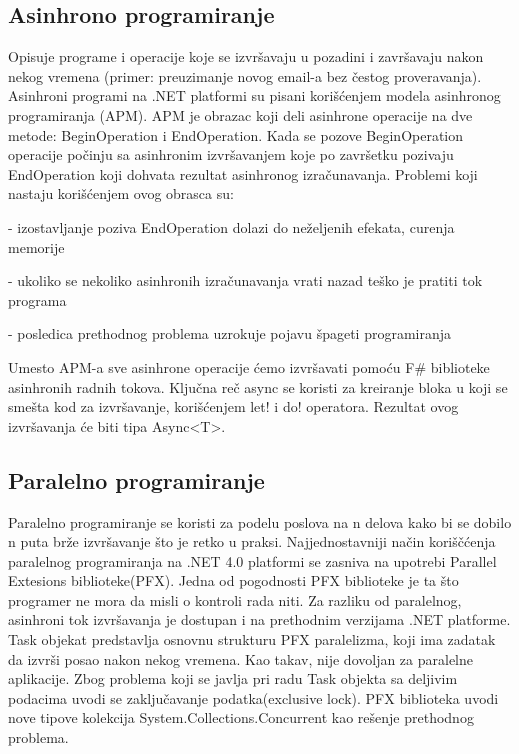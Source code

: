 \documentclass[a4paper]{article}
\begin{document}
\subsection{Asinhrono programiranje} 

Opisuje programe i operacije koje se izvršavaju u pozadini i završavaju nakon nekog vremena (primer: preuzimanje novog email-a bez čestog proveravanja). Asinhroni programi na .NET platformi su pisani korišćenjem modela asinhronog programiranja (APM). APM je obrazac koji deli asinhrone operacije na dve metode: BeginOperation i EndOperation. Kada se pozove BeginOperation operacije počinju sa asinhronim izvršavanjem koje po završetku pozivaju EndOperation koji dohvata rezultat asinhronog izračunavanja. Problemi koji nastaju korišćenjem ovog obrasca su: 

	- izostavljanje poziva EndOperation dolazi do neželjenih efekata, curenja memorije 
 
	- ukoliko se nekoliko asinhronih izračunavanja vrati nazad teško je pratiti tok programa
	
	- posledica prethodnog problema uzrokuje pojavu špageti programiranja

Umesto APM-a sve asinhrone operacije ćemo izvršavati pomoću F\# biblioteke asinhronih radnih tokova\cite{workFlow}. Ključna reč async se koristi za kreiranje bloka u koji se smešta kod za izvršavanje, korišćenjem let! i do! operatora. Rezultat ovog izvršavanja će biti tipa Async<T>\cite{theAL}.

\subsection{Paralelno programiranje}

Paralelno programiranje se koristi za podelu poslova na n delova kako bi se dobilo n puta brže izvršavanje što je retko u praksi. Najjednostavniji način koriščćenja paralelnog programiranja na .NET 4.0 platformi se zasniva na upotrebi Parallel Extesions biblioteke(PFX)\cite{progFsPFX}. Jedna od pogodnosti PFX biblioteke je ta što programer ne mora da misli o kontroli rada niti. Za razliku od paralelnog, asinhroni tok izvršavanja je dostupan i na prethodnim verzijama .NET platforme. Task objekat predstavlja osnovnu strukturu PFX paralelizma, koji ima zadatak da izvrši posao nakon nekog vremena. Kao takav, nije dovoljan za paralelne aplikacije. Zbog problema koji se javlja pri radu Task objekta sa deljivim podacima uvodi se zaključavanje podatka(exclusive lock). PFX biblioteka uvodi nove tipove kolekcija System.Collections.Concurrent \cite{sysCC} kao rešenje prethodnog problema.  
\end{document}
